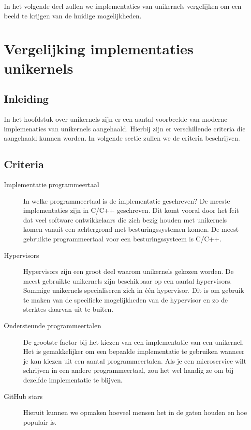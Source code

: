 \documentclass[pdftex,a4paper,12pt,twoside]{report}
\begin{document}
In het volgende deel zullen we implementaties van unikernels vergelijken om een beeld te krijgen van de huidige mogelijkheden.

\chapter{Vergelijking implementaties unikernels}

\section{Inleiding}

In het hoofdstuk over unikernels zijn er een aantal voorbeelde van moderne implemenaties van unikernels aangehaald. Hierbij zijn er verschillende criteria die aangehaald kunnen worden. In volgende sectie zullen we de criteria beschrijven.

\section{Criteria}

\begin{description}
\item [Implementatie programmeertaal]
In welke programmeertaal is de implementatie geschreven? De meeste implementaties zijn in C/C++ geschreven. Dit komt vooral door het feit dat veel software ontwikkelaars die zich bezig houden met unikernels komen vanuit een achtergrond met besturingssystemen komen.
De meest gebruikte programmeertaal voor een besturingssysteem is C/C++.

\item [Hypervisors] 
Hypervisors zijn een groot deel waarom unikernels gekozen worden. De meest gebruikte unikernels zijn beschikbaar op een aantal hypervisors. Sommige unikernels specialiseren zich in één hypervisor.
Dit is om gebruik te maken van de specifieke mogelijkheden van de hypervisor en zo de sterktes daarvan uit te buiten.

\item [Ondersteunde programmeertalen] 
De grootste factor bij het kiezen van een implementatie van een unikernel. Het is gemakkelijker om een bepaalde implementatie te gebruiken wanneer je kan kiezen uit een aantal programmeertalen.
Als je een microservice wilt schrijven in een andere programmeertaal, zou het wel handig ze om bij dezelfde implementatie te blijven.

\item [GitHub stars] 
Hieruit kunnen we opmaken hoeveel mensen het in de gaten houden en hoe populair is.

\end{description}
\end{document}
